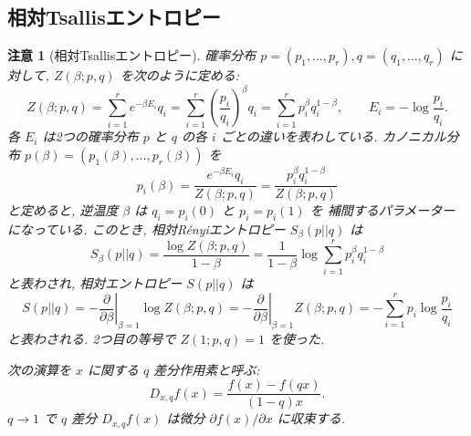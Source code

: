 \documentclass[12pt,twoside]{jarticle}
\renewcommand\d{\partial}
\theoremstyle{jplain}
\theoremstyle{jplain}
\theoremstyle{jplain}
\newtheorem{remark}[theorem]{注意}
\numberwithin{theorem}{section}
\numberwithin{equation}{section}
\numberwithin{figure}{section}
\numberwithin{table}{section}
\begin{document}

\subsection{相対Tsallisエントロピー}
\label{sec:Tsallis}

\begin{remark}[相対Tsallisエントロピー]
\label{remark:Tsallis}
確率分布 $p=(p_1,\ldots,p_r),q=(q_1,\ldots,q_r)$ に対して,
$Z(\beta;p,q)$ を次のように定める:
\[
Z(\beta;p,q)
= \sum_{i=1}^r e^{-\beta E_i} q_i
= \sum_{i=1}^r \left(\frac{p_i}{q_i}\right)^\beta q_i
= \sum_{i=1}^r p_i^\beta q_i^{1-\beta},
\qquad
E_i = -\log\frac{p_i}{q_i}.
\]
各 $E_i$ は2つの確率分布 $p$ と $q$ の各 $i$ ごとの違いを表わしている.
カノニカル分布 $p(\beta)=(p_1(\beta),\ldots,p_r(\beta))$ を
\[
p_i(\beta)
=\frac{e^{-\beta E_i}q_i}{Z(\beta;p,q)}
=\frac{p_i^\beta q_i^{1-\beta}}{Z(\beta;p,q)}
\]
と定めると, 逆温度 $\beta$ は $q_i=p_i(0)$ と $p_i=p_i(1)$ を
補間するパラメーターになっている.
このとき, 相対R\'enyiエントロピー $S_\beta(p||q)$ は
\[
S_\beta(p||q)
=\frac{\log Z(\beta;p,q)}{1-\beta}
=\frac{1}{1-\beta}\log\sum_{i=1}^r p_i^\beta q_i^{1-\beta}
\]
と表わされ, 相対エントロピー $S(p||q)$ は
\[
S(p||q)
=-\left.\frac{\d}{\d\beta}\right|_{\beta=1} \log Z(\beta;p,q)
=-\left.\frac{\d}{\d\beta}\right|_{\beta=1} Z(\beta;p,q)
=-\sum_{i=1}^r p_i\log\frac{p_i}{q_i}
\]
と表わされる. 2つ目の等号で $Z(1;p,q)=1$ を使った.

次の演算を $x$ に関する $q$ 差分作用素と呼ぶ:
\[
D_{x,q}f(x) = \frac{f(x)-f(qx)}{(1-q)x}.
\]
$q\to 1$ で $q$ 差分 $D_{x,q}f(x)$ は微分 $\d f(x)/\d x$ に収束する.


\end{remark}
\end{document}
